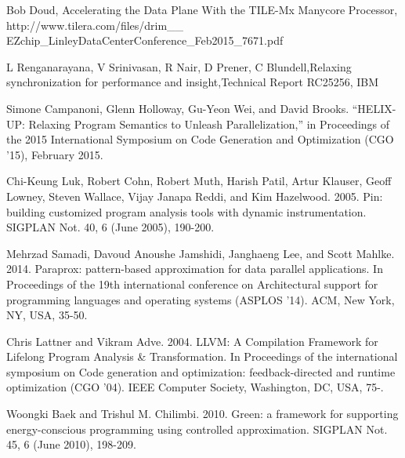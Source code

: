 \documentclass[12pt,conference]{IEEEtran}
\begin{document}
%
%
%
\begin{thebibliography}{11}

Bob Doud, Accelerating the Data Plane With the TILE-Mx Manycore Processor, 
http://www.tilera.com/files/drim\_\_ EZchip\_LinleyDataCenterConference\_Feb2015\_7671.pdf

L Renganarayana, V Srinivasan, R Nair, D Prener, C Blundell,Relaxing synchronization for performance and insight,Technical Report RC25256, IBM 

Simone Campanoni, Glenn Holloway, Gu-Yeon Wei, and David Brooks. “HELIX-UP: Relaxing
Program Semantics to Unleash Parallelization,” in Proceedings of the 2015 International
Symposium on Code Generation and Optimization (CGO ’15), February 2015.

Chi-Keung Luk, Robert Cohn, Robert Muth, Harish Patil, Artur Klauser, Geoff Lowney, Steven Wallace, Vijay Janapa Reddi, and Kim Hazelwood. 2005. Pin: building customized program analysis tools with dynamic instrumentation. SIGPLAN Not. 40, 6 (June 2005), 190-200.

Mehrzad Samadi, Davoud Anoushe Jamshidi, Janghaeng Lee, and Scott Mahlke. 2014. Paraprox: pattern-based approximation for data parallel applications. In Proceedings of the 19th international conference on Architectural support for programming languages and operating systems (ASPLOS '14). ACM, New York, NY, USA, 35-50. 

Chris Lattner and Vikram Adve. 2004. LLVM: A Compilation Framework for Lifelong Program Analysis \& Transformation. In Proceedings of the international symposium on Code generation and optimization: feedback-directed and runtime optimization (CGO '04). IEEE Computer Society, Washington, DC, USA, 75-.

Woongki Baek and Trishul M. Chilimbi. 2010. Green: a framework for supporting energy-conscious programming using controlled approximation. SIGPLAN Not. 45, 6 (June 2010), 198-209. 


\end{thebibliography}
\end{document}
